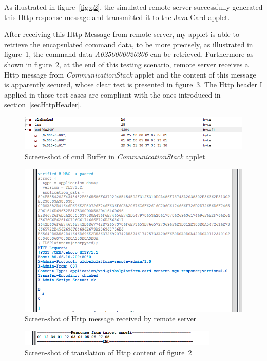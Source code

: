 As illustrated in figure~\ref{fig:q2}, the simulated remote server successfully generated this Http response message and transmitted it to the Java Card applet.

After receiving this Http Message from remote server, my applet is able to retrieve the encapsulated command data, to be more precisely, as illustrated in figure~\ref{fig:remote1}, the command data \emph{A0250000020206} can be retrieved. Furthermore as shown in figure~\ref{fig:q3}, at the end of this testing scenario, remote server receives a Http message from \emph{CommunicationStack} applet and the content of this message is apparently secured, whose clear test is presented in figure~\ref{fig:q4}.
The Http header I applied in those test cases are compliant with the ones introduced in section~\ref{secHttpHeader}.


\begin{figure}[!htb]
	\centering
	\includegraphics[width=1.2\textwidth]{Images/impl/cmd.png}
		\caption{Screen-shot of {cmd} Buffer in \emph{CommunicationStack} applet}
	\label{fig:remote1}
\end{figure}

\begin{figure}[!htb]
	\centering
	\includegraphics[width=1\textwidth]{q3.png}
		\caption{Screen-shot of Http message received by remote server}
	\label{fig:q3}
\end{figure}

\begin{figure}[!htb]
	\centering
	\includegraphics[width=0.85\textwidth]{q4.png}
		\caption{Screen-shot of translation of Http content of figure~\ref{fig:q3}}
	\label{fig:q4}
\end{figure}

